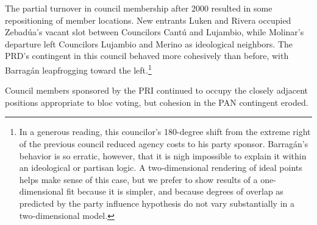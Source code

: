 \documentclass[12 pt, letter]{article}
\begin{document}
The partial turnover in council membership after 2000 resulted in
some repositioning of member locations.  New entrants Luken and
Rivera occupied Zebad\'ua's vacant slot between Councilors Cant\'u
and Lujambio, while Molinar's departure left Councilors Lujambio and
Merino as ideological neighbors.  The PRD's contingent in this
council behaved more cohesively than before, with Barrag\'an
leapfrogging toward the left.\footnote{In a generous reading, this
councilor's 180-degree shift from the extreme right of the previous
council reduced agency costs to his party sponsor.  Barrag\'an's
behavior is so erratic, however, that it is nigh impossible to
explain it within an ideological or partisan logic.  A
two-dimensional rendering of ideal points helps make sense of this
case, but we prefer to show results of a one-dimensional fit because
it is simpler, and because degrees of overlap as predicted by the
party influence hypothesis do not vary substantially in a
two-dimensional model.}


Council members sponsored by the PRI continued to occupy the closely
adjacent positions appropriate to bloc voting, but cohesion in the
PAN contingent eroded.

\end{document}
